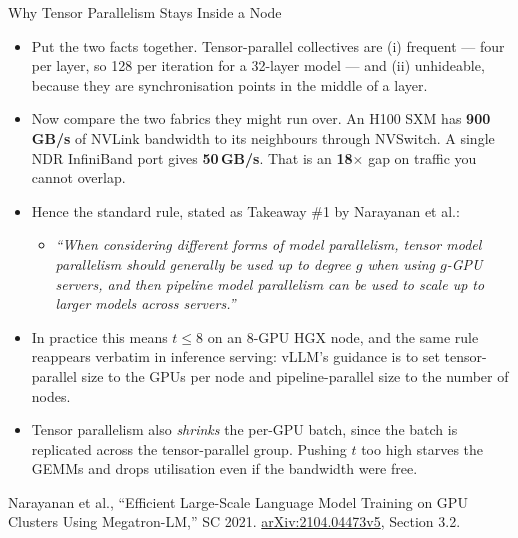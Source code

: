 \begin{frame}[allowframebreaks]{Why Tensor Parallelism Stays Inside a Node}
  \begin{itemize}\itemsep0.4em
    \item[\textcolor{red}{$\blacktriangleright$}] Put the two facts together. Tensor-parallel collectives are (i) frequent --- four per layer, so 128 per iteration for a 32-layer model --- and (ii) unhideable, because they are synchronisation points in the middle of a layer.
    \item[\textcolor{red}{$\blacktriangleright$}] Now compare the two fabrics they might run over. An H100 SXM has \textbf{900\,GB/s} of NVLink bandwidth to its neighbours through NVSwitch. A single NDR InfiniBand port gives \textbf{50\,GB/s}. That is an \textbf{18$\times$} gap on traffic you cannot overlap.
    \item[\textcolor{red}{$\blacktriangleright$}] Hence the standard rule, stated as Takeaway \#1 by Narayanan et al.:
      \begin{itemize}
        \item[] \footnotesize\textit{``When considering different forms of model parallelism, tensor model parallelism should generally be used up to degree $g$ when using $g$-GPU servers, and then pipeline model parallelism can be used to scale up to larger models across servers.''}
      \end{itemize}
    \item[\textcolor{red}{$\blacktriangleright$}] In practice this means \textbf{$t \leq 8$} on an 8-GPU HGX node, and the same rule reappears verbatim in inference serving: vLLM's guidance is to set tensor-parallel size to the GPUs per node and pipeline-parallel size to the number of nodes.
    \item[\textcolor{red}{$\blacktriangleright$}] Tensor parallelism also \emph{shrinks} the per-GPU batch, since the batch is replicated across the tensor-parallel group. Pushing $t$ too high starves the GEMMs and drops utilisation even if the bandwidth were free.
  \end{itemize}
  \vspace{0.1em}
  {\scriptsize Narayanan et al., ``Efficient Large-Scale Language Model Training on GPU
  Clusters Using Megatron-LM,'' SC 2021.
  \href{https://arxiv.org/abs/2104.04473v5}{arXiv:2104.04473v5}, Section 3.2.}
\end{frame}
